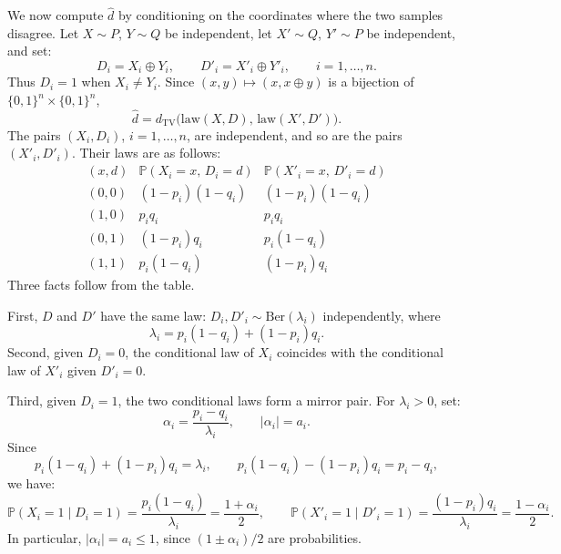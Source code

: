 \documentclass[12pt,reqno]{amsart}
\numberwithin{equation}{section}
\begin{document}
We now compute \(\widehat d\) by conditioning on the coordinates where the
two samples disagree. Let \(X\sim P\), \(Y\sim Q\) be independent, let
\(X'\sim Q\), \(Y'\sim P\) be independent, and set:
\[
D_i=X_i\oplus Y_i,
\qquad
D'_i=X'_i\oplus Y'_i,
\qquad
i=1,\ldots,n.
\]
Thus \(D_i=1\) when \(X_i\ne Y_i\). Since
\((x,y)\mapsto(x,x\oplus y)\) is a bijection of
\(\{0,1\}^n\times\{0,1\}^n\),
\begin{equation}\label{hat_d_XD}
\widehat d
=
d_{\mathrm{TV}}\bigl(\mathrm{law}(X,D),\,\mathrm{law}(X',D')\bigr).
\end{equation}
The pairs \((X_i,D_i)\), \(i=1,\ldots,n\), are independent, and so are the
pairs \((X'_i,D'_i)\). Their laws are as follows:
\[
\begin{array}{c|c|c}
(x,d) & \mathbb P(X_i=x,\,D_i=d) & \mathbb P(X'_i=x,\,D'_i=d)\\\hline
(0,0) & (1-p_i)(1-q_i) & (1-p_i)(1-q_i)\\
(1,0) & p_iq_i & p_iq_i\\
(0,1) & (1-p_i)q_i & p_i(1-q_i)\\
(1,1) & p_i(1-q_i) & (1-p_i)q_i
\end{array}
\]
Three facts follow from the table.
\smallskip%

First, \(D\) and \(D'\) have the same law: \(D_i,D'_i\sim
\mathrm{Ber}(\lambda_i)\) independently, where
\[
\lambda_i=p_i(1-q_i)+(1-p_i)q_i.
\]
Second, given \(D_i=0\), the conditional law of \(X_i\) coincides with the
conditional law of \(X'_i\) given \(D'_i=0\).
\smallskip%

Third, given \(D_i=1\), the two conditional laws form a mirror pair. For
\(\lambda_i>0\), set:
\[
\alpha_i=\frac{p_i-q_i}{\lambda_i},
\qquad
|\alpha_i|=a_i.
\]
Since
\[
p_i(1-q_i)+(1-p_i)q_i=\lambda_i,
\qquad
p_i(1-q_i)-(1-p_i)q_i=p_i-q_i,
\]
we have:
\[
\mathbb P(X_i=1\mid D_i=1)
=
\frac{p_i(1-q_i)}{\lambda_i}
=
\frac{1+\alpha_i}2,
\qquad
\mathbb P(X'_i=1\mid D'_i=1)
=
\frac{(1-p_i)q_i}{\lambda_i}
=
\frac{1-\alpha_i}2.
\]
In particular, \(|\alpha_i|=a_i\le1\), since \((1\pm\alpha_i)/2\) are
probabilities.
\smallskip%
\end{document}
